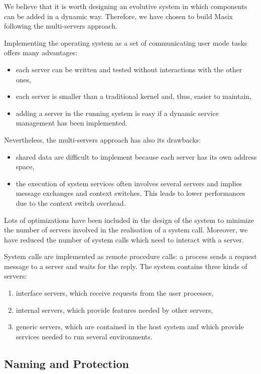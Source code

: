 	We believe that it is worth designing an evolutive system in which
components can
be added in a dynamic way. Therefore, we have chosen to build Masix following
the multi-servers approach.

	Implementing the operating
system as a set of communicating user mode tasks offers many advantages:
\begin {itemize}
\item each server can be written and tested without interactions with the
other ones,
\item each server is smaller than a traditional kernel and, thus, easier
to maintain,
\item adding a server in the running system is easy if a dynamic service
management has been implemented.
\end {itemize}

	Nevertheless, the multi-servers approach has also its drawbacks:
\begin {itemize}
\item shared data are difficult to implement because each server has its
own address space,
\item the execution of system services often involves several servers and
implies message exchanges and context switches. This leads to lower
performances due to the context switch overhead.
\end {itemize}

	Lots of optimizations have been included in the design of the system
to minimize the number of servers involved in the realisation of a system call.
Moreover, we have reduced the number of system calls which need to interact
with a server.

	System calls are implemented as remote procedure calls: a process
sends a request message to a server and waits for the reply. The system
contains three kinds of servers:
\begin {enumerate}
\item interface servers, which receive requests from the user processes,
\item internal servers, which provide features needed by other servers,
\item generic servers, which are contained in the host system and which
provide services needed to run several environments.
\end {enumerate}
	
\subsection {Naming and Protection}

